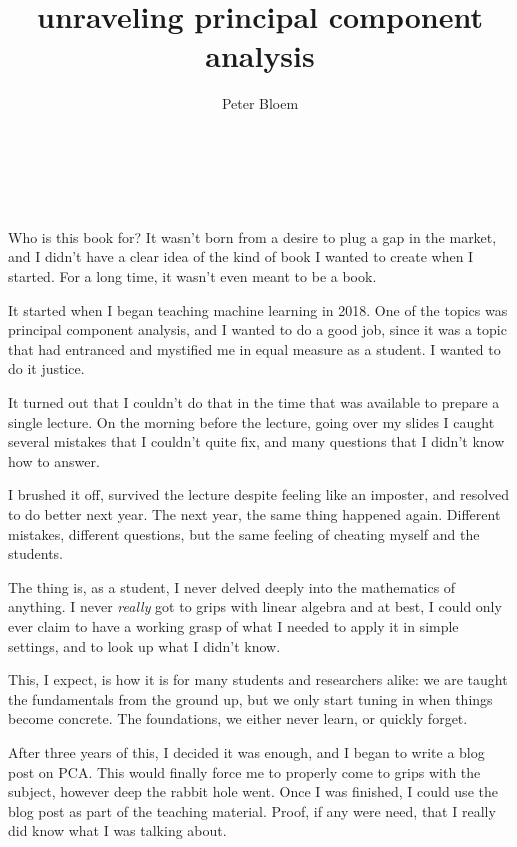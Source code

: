 \documentclass{pca}
\title{\Large unraveling principal component analysis}
\author{Peter Bloem}
\theoremstyle{theorem}
\theoremstyle{proof}
\begin{document}
%
%


\maketitle %

\tableofcontents

\cleardoublepage

\chapter*{~}

\vspace{-131pt}

Who is this book for? It wasn't born from a desire to plug a gap in the market, and I didn't have a clear idea of the kind of book I wanted to create when I started. For a long time, it wasn't even meant to be a book. 

It started when I began teaching machine learning in 2018. One of the topics was principal component analysis, and I wanted to do a good job, since it was a topic that had entranced and mystified me in equal measure as a student. I wanted to do it justice.

It turned out that I couldn't do that in the time that was available to prepare a single lecture. On the morning before the lecture, going over my slides I caught several mistakes that I couldn't quite fix, and many questions that I didn't know how to answer.

I brushed it off, survived the lecture despite feeling like an imposter, and resolved to do better next year. The next year, the same thing happened again. Different mistakes, different questions, but the same feeling of cheating myself and the students.

The thing is, as a student, I never delved deeply into the mathematics of anything. I never \emph{really} got to grips with linear algebra and at best, I could only ever claim to have a working grasp of what I needed to apply it in simple settings, and to look up what I didn't know. 

This, I expect, is how it is for many students and researchers alike: we are taught the fundamentals from the ground up, but we only start tuning in when things become concrete. The foundations, we either never learn, or quickly forget.

After three years of this, I decided it was enough, and I began to write a blog post on PCA. This would finally force me to properly come to grips with the subject, however deep the rabbit hole went. Once I was finished, I could use the blog post as part of the teaching material. Proof, if any were need, that I really did know what I was talking about.
\end{document}
